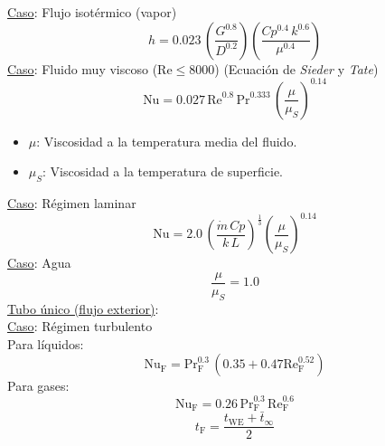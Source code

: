 \documentclass[letter,oneside,10pt]{article}
\begin{document}
\begin{multicols}{3}
\underline{Caso}: Flujo isotérmico (vapor)
\vspace{-0.3cm}
\begin{equation*}
    h = 0.023\,
    \left(\frac{G^{0.8}}{D^{0.2}}\right)
    \left(\frac{Cp^{0.4}\,k^{0.6}}{\mu^{0.4}}\right)
\end{equation*}
\underline{Caso}: Fluido muy viscoso ($\text{Re} \le 8000$) (Ecuación de
\emph{Sieder} y \emph{Tate})
\vspace{-0.3cm}
\begin{equation*}
    \text{Nu} = 0.027\,\text{Re}^{0.8}\,\text{Pr}^{0.333}\,
    \left(\frac{\mu}{\mu_S}\right)^{0.14}
\end{equation*}
\vspace{-0.3cm}
\tiny
\begin{itemize}
    \item $\mu$: Viscosidad a la temperatura media del fluido.
    \item $\mu_S$: Viscosidad a la temperatura de superficie.
\end{itemize}
\scriptsize
\underline{Caso}: Régimen laminar
\vspace{-0.3cm}
\begin{equation*}
    \text{Nu} = 2.0\,
    \left(\frac{\dot{m}\,Cp}{k\,L}\right)^{\frac{1}{3}}
    \left(\frac{\mu}{\mu_S}\right)^{0.14}
\end{equation*}
\underline{Caso}: Agua
\vspace{-0.3cm}
\begin{equation*}
    \frac{\mu}{\mu_S} = 1.0
\end{equation*}
\underline{Tubo único (flujo exterior)}:\\
\underline{Caso}: Régimen turbulento\\
Para líquidos:
\vspace{-0.3cm}
\begin{equation*}
    \text{Nu}_\text{F} = \text{Pr}_\text{F}^{0.3}\,
    (0.35+0.47\text{Re}_\text{F}^{0.52})
\end{equation*}
Para gases:
\vspace{-0.3cm}
\begin{equation*}
    \text{Nu}_\text{F} = 0.26\,\text{Pr}_\text{F}^{0.3}\,
    \text{Re}_\text{F}^{0.6}
\end{equation*}
\vspace{-0.3cm}
\begin{equation*}
    t_\text{F} = \frac{t_\text{WE} + \bar{t}_{\infty}}{2}
\end{equation*}
\vspace{-0.2cm}

\end{multicols}
\end{document}
